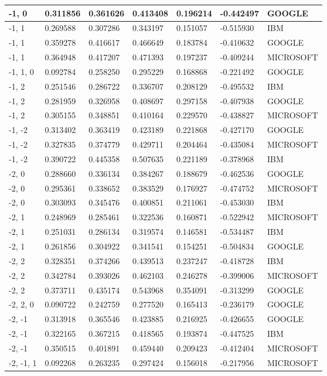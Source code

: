 \documentclass[a4paper,10pt]{article}
\begin{document}
\begin{tabular}{|l|l|l|l|l|l|l|}
-1, 0 & 0.311856 & 0.361626 & 0.413408 & 0.196214 & -0.442497 & GOOGLE \\ \hline
-1, 1 & 0.269588 & 0.307286 & 0.343197 & 0.151057 & -0.515930 & IBM \\ \hline
-1, 1 & 0.359278 & 0.416617 & 0.466649 & 0.183784 & -0.410632 & GOOGLE \\ \hline
-1, 1 & 0.364948 & 0.417207 & 0.471393 & 0.197237 & -0.409244 & MICROSOFT \\ \hline
-1, 1, 0 & 0.092784 & 0.258250 & 0.295229 & 0.168868 & -0.221492 & GOOGLE \\ \hline
-1, 2 & 0.251546 & 0.286722 & 0.336707 & 0.208129 & -0.495532 & IBM \\ \hline
-1, 2 & 0.281959 & 0.326958 & 0.408697 & 0.297158 & -0.407938 & GOOGLE \\ \hline
-1, 2 & 0.305155 & 0.348851 & 0.410164 & 0.229570 & -0.438827 & MICROSOFT \\ \hline
-1, -2 & 0.313402 & 0.363419 & 0.423189 & 0.221868 & -0.427170 & GOOGLE \\ \hline
-1, -2 & 0.327835 & 0.374779 & 0.429711 & 0.204464 & -0.435084 & MICROSOFT \\ \hline
-1, -2 & 0.390722 & 0.445358 & 0.507635 & 0.221189 & -0.378968 & IBM \\ \hline
-2, 0 & 0.288660 & 0.336134 & 0.384267 & 0.188679 & -0.462536 & GOOGLE \\ \hline
-2, 0 & 0.295361 & 0.338652 & 0.383529 & 0.176927 & -0.474752 & MICROSOFT \\ \hline
-2, 0 & 0.303093 & 0.345476 & 0.400851 & 0.211061 & -0.453030 & IBM \\ \hline
-2, 1 & 0.248969 & 0.285461 & 0.322536 & 0.160871 & -0.522942 & MICROSOFT \\ \hline
-2, 1 & 0.251031 & 0.286134 & 0.319574 & 0.146581 & -0.534487 & IBM \\ \hline
-2, 1 & 0.261856 & 0.304922 & 0.341541 & 0.154251 & -0.504834 & GOOGLE \\ \hline
-2, 2 & 0.328351 & 0.374266 & 0.439513 & 0.237247 & -0.418728 & IBM \\ \hline
-2, 2 & 0.342784 & 0.393026 & 0.462103 & 0.246278 & -0.399006 & MICROSOFT \\ \hline
-2, 2 & 0.373711 & 0.435174 & 0.543968 & 0.354091 & -0.313299 & GOOGLE \\ \hline
-2, 2, 0 & 0.090722 & 0.242759 & 0.277520 & 0.165413 & -0.236179 & GOOGLE \\ \hline
-2, -1 & 0.313918 & 0.365546 & 0.423885 & 0.216925 & -0.426655 & GOOGLE \\ \hline
-2, -1 & 0.322165 & 0.367215 & 0.418565 & 0.193874 & -0.447525 & IBM \\ \hline
-2, -1 & 0.350515 & 0.401891 & 0.459440 & 0.209423 & -0.412404 & MICROSOFT \\ \hline
-2, -1, 1 & 0.092268 & 0.263235 & 0.297424 & 0.156018 & -0.217956 & MICROSOFT \\ \hline
\end{tabular}
\end{document}

